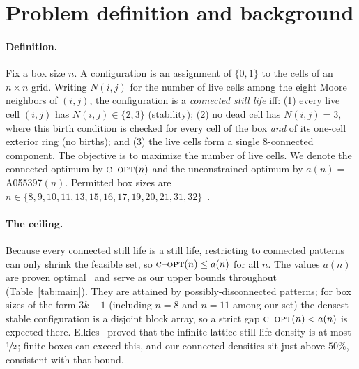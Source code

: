 \documentclass{article}
\newcommand{\copt}{\textsc{c\textendash opt}}
\begin{document}
\section{Problem definition and background}
\label{sec:problem}

\paragraph{Definition.} Fix a box size $n$. A configuration is an assignment of $\{0,1\}$ to the cells of an $n\times n$ grid. Writing $N(i,j)$ for the number of live cells among the eight Moore neighbors of $(i,j)$, the configuration is a \emph{connected still life} iff: (1) every live cell $(i,j)$ has $N(i,j)\in\{2,3\}$ (stability); (2) no dead cell has $N(i,j)=3$, where this birth condition is checked for every cell of the box \emph{and} of its one-cell exterior ring (no births); and (3) the live cells form a single $8$-connected component. The objective is to maximize the number of live cells. We denote the connected optimum by $\copt(n)$ and the unconstrained optimum by $a(n)=$ A055397$(n)$. Permitted box sizes are $n\in\{8,9,10,11,13,15,16,17,19,20,21,31,32\}$~\citep{problem}.

\paragraph{The ceiling.} Because every connected still life is a still life, restricting to connected patterns can only shrink the feasible set, so $\copt(n)\le a(n)$ for all $n$. The values $a(n)$ are proven optimal~\citep{chu2012} and serve as our upper bounds throughout (Table~\ref{tab:main}). They are attained by possibly-disconnected patterns; for box sizes of the form $3k-1$ (including $n=8$ and $n=11$ among our set) the densest stable configuration is a disjoint block array, so a strict gap $\copt(n)<a(n)$ is expected there. Elkies~\citep{elkies1998} proved that the infinite-lattice still-life density is at most $\nicefrac{1}{2}$; finite boxes can exceed this, and our connected densities sit just above $50\%$, consistent with that bound.
\end{document}
